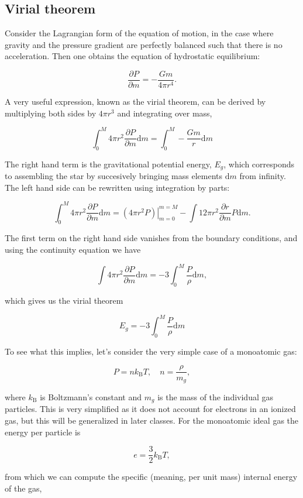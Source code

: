 \documentclass[twocolumn]{article}
\begin{document}
\hypertarget{virial-theorem}{%
\subsection{Virial theorem}\label{virial-theorem}}

Consider the Lagrangian form of the equation of motion, in the case
where gravity and the pressure gradient are perfectly balanced such that
there is no acceleration. Then one obtains the equation of hydrostatic
equilibrium:

\[\boxed{\frac{\partial P}{\partial m}=-\frac{Gm}{4\pi r^4}.}\]

A very useful expression, known as the virial theorem, can be derived by
multiplying both sides by \(4\pi r^3\) and integrating over mass,

\[\int_0^M 4\pi r^2 \frac{\partial P}{\partial m}\mathrm{d}m=\int_0^M -\frac{Gm}{r}\mathrm{d}m\]

The right hand term is the gravitational potential energy, \(E_g\),
which corresponds to assembling the star by succesively bringing mass
elements \(\mathrm{d}m\) from infinity. The left hand side can be
rewritten using integration by parts:

\[\int_0^M 4\pi r^2 \frac{\partial P}{\partial m}\mathrm{d}m = \left.(4\pi r^2 P)\right|_{m=0}^{m=M}-\int 12\pi r^2 \frac{\partial r}{\partial m}P \mathrm{d}m.\]

The first term on the right hand side vanishes from the boundary
conditions, and using the continuity equation we have

\[\int 4\pi r^2 \frac{\partial P}{\partial m}\mathrm{d}m = -3\int_0^M\frac{P}{\rho}\mathrm{d}m,\]

which gives us the virial theorem

\[\boxed{E_g = -3\int_0^M\frac{P}{\rho}\mathrm{d}m}\tag{1.5}\]

To see what this implies, let's consider the very simple case of a
monoatomic gas:

\[P=nk_\mathrm{B}T,\quad n=\frac{\rho}{m_g},\tag{1.6}\]

where \(k_\mathrm{B}\) is Boltzmann's constant and \(m_g\) is the mass
of the individual gas particles. This is very simplified as it does not
account for electrons in an ionized gas, but this will be generalized in
later classes. For the monoatomic ideal gas the energy per particle is

\[e=\frac{3}{2}k_\mathrm{B}T,\]

from which we can compute the specific (meaning, per unit mass) internal
energy of the gas,
\end{document}
